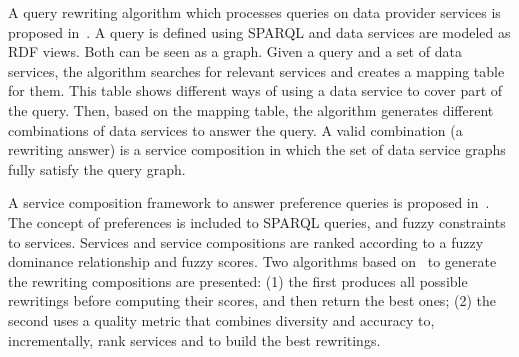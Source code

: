 A query rewriting algorithm which processes queries on data provider services is proposed in~\cite{Barhamgi2010}.
A query is defined using SPARQL and data services are modeled as RDF views.
Both can be seen as a graph. 
Given a query and a set of data services, the algorithm searches for relevant services and creates a mapping table for them. 
This table shows different ways of using a data service to cover part of the query. 
Then, based on the mapping table, the algorithm generates different combinations of data services to answer the query.
A valid combination (a rewriting answer) is a service composition in which the set of data service graphs fully satisfy the query graph.  

A service composition framework to answer preference queries is proposed in~\cite{Benouaret2011}. 
The concept of preferences is included to SPARQL queries, and fuzzy constraints to services.
Services and service compositions are ranked according to a fuzzy dominance relationship and fuzzy scores.
Two algorithms based on~\cite{Barhamgi2010} to generate the rewriting compositions are presented: (1) the first produces all possible rewritings before computing their scores, and then return the best ones; (2) the second uses a quality metric that combines diversity and accuracy to, incrementally, rank services and to build the best rewritings.
